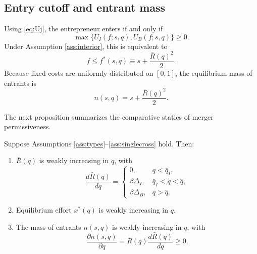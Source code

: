 \subsection{Entry cutoff and entrant mass}

Using \eqref{eq:Uj}, the entrepreneur enters if and only if
\begin{equation}
    \max\{U_I(f;s,q),U_B(f;s,q)\} \ge 0.
\end{equation}
Under Assumption \ref{ass:interior}, this is equivalent to
\begin{equation}\label{eq:entrycutoff}
    f \le f^*(s,q)
    \equiv
    s + \frac{\bar R(q)^2}{2}.
\end{equation}
Because fixed costs are uniformly distributed on \([0,1]\), the equilibrium mass of entrants is
\begin{equation}\label{eq:nsq}
    n(s,q)
    =
    s+\frac{\bar R(q)^2}{2}.
\end{equation}

The next proposition summarizes the comparative statics of merger permissiveness.

\begin{proposition}\label{prop:entrymonotonicity}
Suppose Assumptions \ref{ass:types}--\ref{ass:singlecross} hold.
Then:

\begin{enumerate}
    \item \(\bar R(q)\) is weakly increasing in \(q\), with
    \begin{equation}\label{eq:dRbardq}
        \frac{d\bar R(q)}{dq}
        =
        \begin{cases}
            0, & q < \bar q_I, \\
            \beta \Delta_I, & \bar q_I < q < \hat q, \\
            \beta \Delta_B, & q > \hat q.
        \end{cases}
    \end{equation}

    \item Equilibrium effort \(x^*(q)\) is weakly increasing in \(q\).

    \item The mass of entrants \(n(s,q)\) is weakly increasing in \(q\), with
    \begin{equation}\label{eq:dndq}
        \frac{\partial n(s,q)}{\partial q}
        =
        \bar R(q)\frac{d\bar R(q)}{dq}
        \ge 0.
    \end{equation}
\end{enumerate}
\end{proposition}

